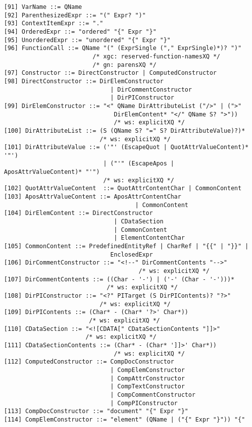 \begin{verbatim}
[91] VarName ::= QName
[92] ParenthesizedExpr ::= "(" Expr? ")"
[93] ContextItemExpr ::= "."
[94] OrderedExpr ::= "ordered" "{" Expr "}"
[95] UnorderedExpr ::= "unordered" "{" Expr "}"
[96] FunctionCall ::= QName "(" (ExprSingle ("," ExprSingle)*)? ")" 
                         /* xgc: reserved-function-namesXQ */
                         /* gn: parensXQ */
[97] Constructor ::= DirectConstructor | ComputedConstructor
[98] DirectConstructor ::= DirElemConstructor
                              | DirCommentConstructor
                              | DirPIConstructor
[99] DirElemConstructor ::= "<" QName DirAttributeList ("/>" | (">"
                               DirElemContent* "</" QName S? ">"))	
                               /* ws: explicitXQ */
[100] DirAttributeList ::= (S (QName S? "=" S? DirAttributeValue)?)*	
                           /* ws: explicitXQ */
[101] DirAttributeValue ::= ('"' (EscapeQuot | QuotAttrValueContent)* '"')
                            | ("'" (EscapeApos | AposAttrValueContent)* "'")	
                            /* ws: explicitXQ */ 
[102] QuotAttrValueContent	::= QuotAttrContentChar | CommonContent
[103] AposAttrValueContent ::= AposAttrContentChar
                                     | CommonContent
[104] DirElemContent ::= DirectConstructor
                               | CDataSection
                               | CommonContent
                               | ElementContentChar
[105] CommonContent ::= PredefinedEntityRef | CharRef | "{{" | "}}" |
                              EnclosedExpr
[106] DirCommentConstructor ::= "<!--" DirCommentContents "-->"
                                      /* ws: explicitXQ */
[107] DirCommentContents ::= ((Char - '-') | ('-' (Char - '-')))*	
                             /* ws: explicitXQ */
[108] DirPIConstructor ::= "<?" PITarget (S DirPIContents)? "?>"	
                           /* ws: explicitXQ */
[109] DirPIContents ::= (Char* - (Char* '?>' Char*))	
                        /* ws: explicitXQ */
[110] CDataSection ::= "<![CDATA[" CDataSectionContents "]]>"
                       /* ws: explicitXQ */
[111] CDataSectionContents ::= (Char* - (Char* ']]>' Char*))	
                               /* ws: explicitXQ */ 
[112] ComputedConstructor ::= CompDocConstructor
                              | CompElemConstructor
                              | CompAttrConstructor
                              | CompTextConstructor
                              | CompCommentConstructor
                              | CompPIConstructor
[113] CompDocConstructor ::= "document" "{" Expr "}"
[114] CompElemConstructor ::= "element" (QName | ("{" Expr "}")) "{"

\end{verbatim}
